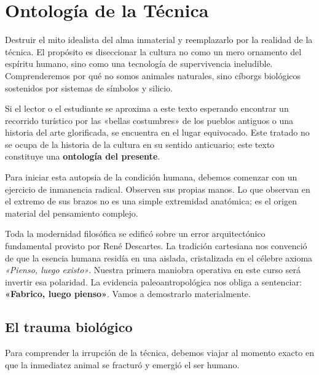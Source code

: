 \chapter{Ontología de la Técnica}
\label{cap:technique_ontology}

\begin{objetivo}
Destruir el mito idealista del alma inmaterial y reemplazarlo por la realidad de la técnica. El propósito es diseccionar la cultura no como un mero ornamento del espíritu humano, sino como una tecnología de supervivencia ineludible. Comprenderemos por qué no somos animales naturales, sino cíborgs biológicos sostenidos por sistemas de símbolos y silicio.
\end{objetivo}

Si el lector o el estudiante se aproxima a este texto esperando encontrar un recorrido turístico por las «bellas costumbres» de los pueblos antiguos o una historia del arte glorificada, se encuentra en el lugar equivocado. Este tratado no se ocupa de la historia de la cultura en su sentido anticuario; este texto constituye una \textbf{ontología del presente}. 

Para iniciar esta autopsia de la condición humana, debemos comenzar con un ejercicio de inmanencia radical. Observen sus propias manos. Lo que observan en el extremo de sus brazos no es una simple extremidad anatómica; es el origen material del pensamiento complejo. 

Toda la modernidad filosófica se edificó sobre un error arquitectónico fundamental provisto por René Descartes. La tradición cartesiana nos convenció de que la esencia humana residía en una \ResCogitans{} aislada, cristalizada en el célebre axioma \textit{«Pienso, luego existo»}. Nuestra primera maniobra operativa en este curso será invertir esa polaridad. La evidencia paleoantropológica nos obliga a sentenciar: \textbf{«Fabrico, luego pienso»}. Vamos a demostrarlo materialmente.

\section{El trauma biológico}

Para comprender la irrupción de la técnica, debemos viajar al momento exacto en que la inmediatez animal se fracturó y emergió el ser humano. 

